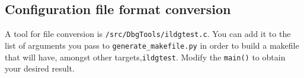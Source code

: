\documentclass[a4paper,10pt]{book}
\begin{document}
\subsection{Configuration file format conversion}
A tool for file conversion is \verb|/src/DbgTools/ildgtest.c|. You can add it 
to the list of arguments you pass to \verb|generate_makefile.py| in order to 
build a makefile that will have, amongst other targets,\verb|ildgtest|.
Modify the \verb|main()| to obtain your desired result.
  
  
  
\end{document}
